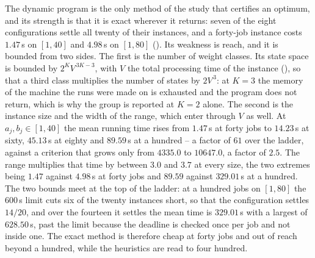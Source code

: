\documentclass[12pt]{article}
\begin{document}
\begin{sloppypar}
        The dynamic program is the only method of the study that certifies an optimum, and its strength is
        that it is exact wherever it returns: seven of the eight configurations settle all twenty of their
        instances, and a forty-job instance costs $1.47$\,s on $[1,40]$ and $4.98$\,s on $[1,80]$
        (). Its
        weakness is reach, and it is bounded from two sides. The first is the number of weight classes.
        Its state space is bounded by $2^{K}V^{\,3K-3}$, with $V$ the total processing time of the instance
        (), so that a third class multiplies the number of states by $2V^{\,3}$: at
        $K=3$ the memory of the machine the runs were made on is exhausted and the program does not
        return, which is why the group is reported at $K=2$ alone. The second is the instance size and the
        width of the range, which enter through $V$ as well. At $a_j,b_j\in[1,40]$ the mean running time
        rises from $1.47$\,s at forty jobs to $14.23$\,s at sixty, $45.13$\,s at eighty and $89.59$\,s at
        a hundred -- a factor of $61$ over the ladder, against a criterion that grows only from $4335.0$
        to $10647.0$, a factor of $2.5$. The range multiplies that time by between $3.0$ and $3.7$ at
        every size, the two extremes being $1.47$ against $4.98$\,s at forty jobs and $89.59$ against
        $329.01$\,s at a hundred. The two bounds meet at the top of the ladder: at a hundred jobs on
        $[1,80]$ the $600$\,s limit cuts six of the twenty instances short, so that the configuration
        settles $14/20$, and over the fourteen it settles the mean time is $329.01$\,s with a largest of
        $628.50$\,s, past the limit because the deadline is checked once per job and not inside one. The
        exact method is therefore cheap at forty jobs and out of reach beyond a hundred, while the
        heuristics are read to four hundred.
        

\end{sloppypar}
\end{document}
